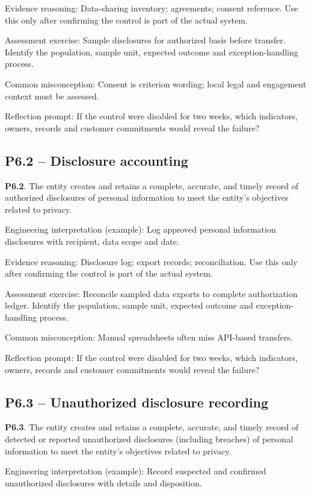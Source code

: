 \documentclass[10pt,oneside]{report}
\begin{document}
Evidence reasoning: Data-sharing inventory; agreements; consent reference. Use this only after confirming the control is part of the actual system.

Assessment exercise: Sample disclosures for authorized basis before transfer. Identify the population, sample unit, expected outcome and exception-handling process.

Common misconception: Consent is criterion wording; local legal and engagement context must be assessed.

Reflection prompt: If the control were disabled for two weeks, which indicators, owners, records and customer commitments would reveal the failure?

\subsection{P6.2 -- Disclosure accounting}
\begin{aicpabox}
\textbf{P6.2}. The entity creates and retains a complete, accurate, and timely record of authorized disclosures of personal information to meet the entity's objectives related to privacy.\par{}
\end{aicpabox}
Engineering interpretation (example): Log approved personal information disclosures with recipient, data scope and date.

Evidence reasoning: Disclosure log; export records; reconciliation. Use this only after confirming the control is part of the actual system.

Assessment exercise: Reconcile sampled data exports to complete authorization ledger. Identify the population, sample unit, expected outcome and exception-handling process.

Common misconception: Manual spreadsheets often miss API-based transfers.

Reflection prompt: If the control were disabled for two weeks, which indicators, owners, records and customer commitments would reveal the failure?

\subsection{P6.3 -- Unauthorized disclosure recording}
\begin{aicpabox}
\textbf{P6.3}. The entity creates and retains a complete, accurate, and timely record of detected or reported unauthorized disclosures (including breaches) of personal information to meet the entity's objectives related to privacy.\par{}
\end{aicpabox}
Engineering interpretation (example): Record suspected and confirmed unauthorized disclosures with details and disposition.
\end{document}
